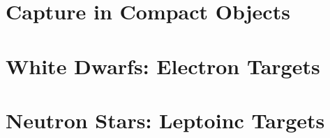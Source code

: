 \section{Capture in Compact Objects}

\section{White Dwarfs: Electron Targets}

\section{Neutron Stars: Leptoinc Targets}
